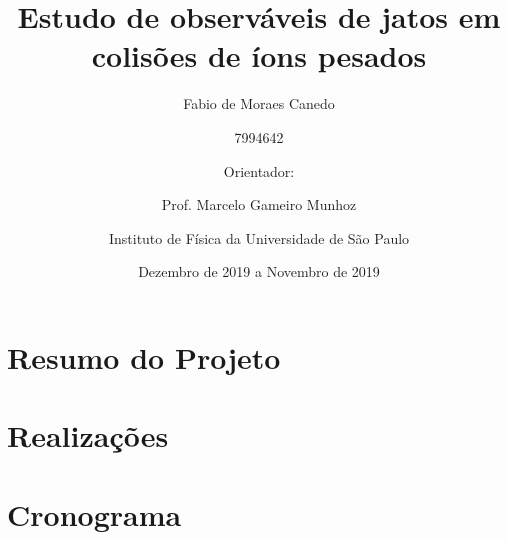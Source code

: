 \documentclass[a4paper,12pt]{article}
\title{Estudo de observáveis de jatos em colisões de íons pesados}
\author{Fabio de Moraes Canedo \and
7994642 \and
Orientador: \and
Prof. Marcelo Gameiro Munhoz \and
Instituto de Física da Universidade de São Paulo \and
Dezembro de 2019 a Novembro de 2019}
\begin{document}
\maketitle

\blankpage

%

%

\section{Resumo do Projeto}



\section{Realizações}



\section{Cronograma}





%
\end{document}
